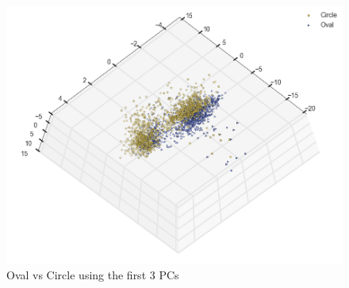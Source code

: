 \documentclass[journal]{IEEEtran}
\begin{document}
\begin{figure}[H]
\centering
\includegraphics[width=0.9\linewidth]{pca_oval_circle}
\caption{Oval vs Circle using the first 3 PCs}
\label{fig:pca_not_sep}
\end{figure}
\end{document}
